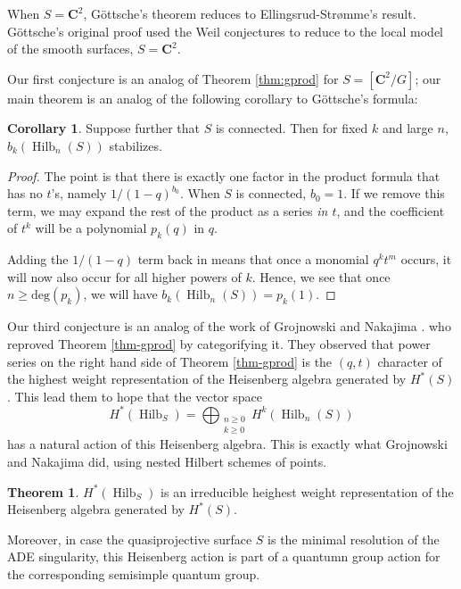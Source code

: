 \documentclass{amsart}[12pt]
\theoremstyle{definition}
\newtheorem{theorem}[dummy]{Theorem}
\newtheorem{corollary}[dummy]{Corollary}
\newcommand{\C}{\mathbf{C}}
\DeclareMathOperator{\Hilb}{Hilb}
\newcommand{\HG}{\Hilb}
\begin{document}
When $S=\C^2$, G\"ottsche's theorem reduces to Ellingsrud-Str\o mme's result.  G\"ottsche's original proof used the Weil conjectures to reduce to the local model of the smooth surfaces, $S=\C^2$.  

Our first conjecture is an analog of Theorem \ref{thm:gprod} for $S=[\C^2/G]$; our main theorem is an analog of the following corollary to G\"ottsche's formula:

\begin{corollary} \label{cor:gstab} Suppose further that $S$ is connected.
Then for fixed $k$ and large $n$, $b_{k}(\Hilb_n(S))$ stabilizes.
\end{corollary}

\begin{proof}
The point is that there is exactly one factor in the product formula that has no $t$'s, namely $1/(1-q)^{b_0}$.  When $S$ is connected, $b_0=1$.  If we remove this term, we may expand the rest of the product as a series \emph{in $t$}, and the coefficient of $t^k$ will be a polynomial $p_k(q)$ in $q$.  

Adding the $1/(1-q)$ term back in means that once a monomial $q^kt^m$ occurs, it will now also occur for all higher powers of $k$.  Hence, we see that once $n\geq\text{deg}(p_k)$, we will have $b_k(\Hilb_n(S))=p_k(1)$.
\end{proof}

Our third conjecture is an analog of the work of Grojnowski and Nakajima \cite{grojnowski, nakajimaheisenberg}. who reproved Theorem \ref{thm-gprod} by categorifying it.  They observed that power series on the right hand side of Theorem \ref{thm-gprod} is the $(q,t)$ character of the highest weight representation of the Heisenberg algebra generated by $H^*(S)$.  This lead them to hope that the vector space 
$$H^*(\HG_S)=\bigoplus_{\substack{n\geq 0 \\ k\geq 0}} H^k(\Hilb_n(S))$$
has a natural action of this Heisenberg algebra.  This is exactly what Grojnowski and Nakajima did, using nested Hilbert schemes of points.  

\begin{theorem} \label{thm:grojnowskinakajima}
$H^*(\HG_S)$ is an irreducible heighest weight representation of the Heisenberg algebra generated by $H^*(S)$.
  \end{theorem}

Moreover, in case the quasiprojective surface $S$ is the minimal resolution of the ADE singularity, this Heisenberg action is part of a quantumn group action for the corresponding semisimple quantum group.
\end{document}
